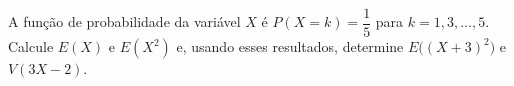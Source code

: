 %
%


\begin{exercicioBanco}[\valorquestao]
    A função de probabilidade da variável \(X\) é \(P(X=k) = \dfrac{1}{5}\) para \(k = 1, 3, \dots, 5\). Calcule \(E(X)\) e \(E(X^{2})\) e, usando esses resultados, determine \(E\big((X+3)^{2}\big)\) e \(V(3X-2)\).
\end{exercicioBanco}

